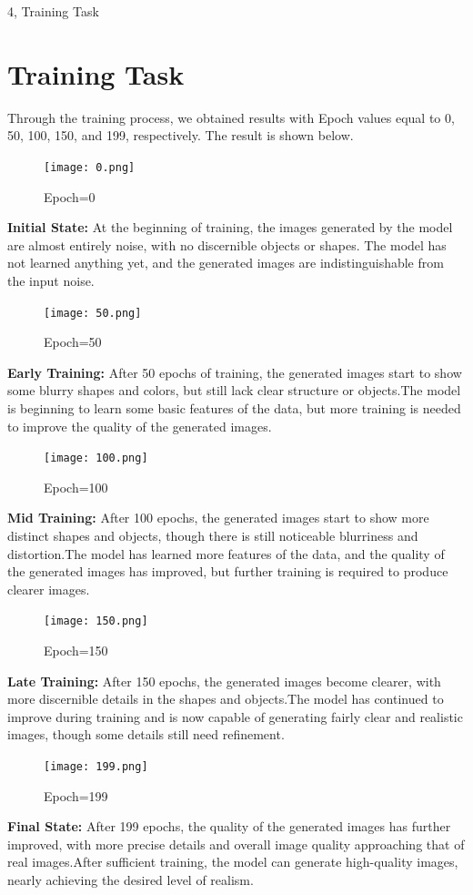 \documentclass[10pt,a4paper]{article}
\begin{document}
\newpage
\begin{task}{4, Training Task}
\section{Training Task}
Through the training process, we obtained results with Epoch values equal to 0, 50, 100, 150, and 199, respectively. The result is shown below. 
\begin{figure}[H]
    \centering
    \texttt{[image: 0.png]}
    \caption{Epoch=0}
    \label{fig:training_process}
\end{figure}
\textbf{Initial State:} At the beginning of training, the images generated by the model are almost entirely noise, with no discernible objects or shapes. The model has not learned anything yet, and the generated images are indistinguishable from the input noise.

\begin{figure}[H]
    \centering
    \texttt{[image: 50.png]}
    \caption{Epoch=50}
    \label{fig:training_process}
\end{figure}
\textbf{Early Training:} After 50 epochs of training, the generated images start to show some blurry shapes and colors, but still lack clear structure or objects.The model is beginning to learn some basic features of the data, but more training is needed to improve the quality of the generated images.
\begin{figure}[H]
    \centering
    \texttt{[image: 100.png]}
    \caption{Epoch=100}
    \label{fig:training_process}
\end{figure}
\textbf{Mid Training:} After 100 epochs, the generated images start to show more distinct shapes and objects, though there is still noticeable blurriness and distortion.The model has learned more features of the data, and the quality of the generated images has improved, but further training is required to produce clearer images.
\begin{figure}[H]
    \centering
    \texttt{[image: 150.png]}
    \caption{Epoch=150}
    \label{fig:training_process}
\end{figure}
\textbf{Late Training:} After 150 epochs, the generated images become clearer, with more discernible details in the shapes and objects.The model has continued to improve during training and is now capable of generating fairly clear and realistic images, though some details still need refinement.
\begin{figure}[H]
    \centering
    \texttt{[image: 199.png]}
    \caption{Epoch=199}
    \label{fig:training_process}
\end{figure}
\textbf{Final State:} After 199 epochs, the quality of the generated images has further improved, with more precise details and overall image quality approaching that of real images.After sufficient training, the model can generate high-quality images, nearly achieving the desired level of realism.


\end{task}
\end{document}
